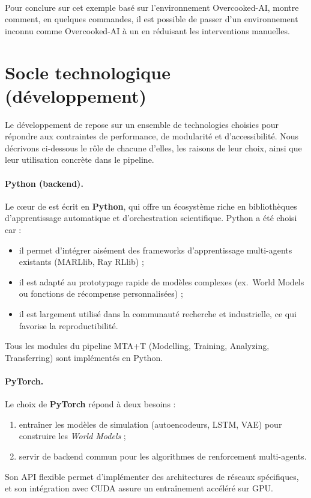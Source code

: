 \

Pour conclure sur cet exemple basé sur l'environnement Overcooked-AI,  montre comment, en quelques commandes, il est possible de passer d'un environnement inconnu comme Overcooked-AI à un  en réduisant les interventions manuelles.


\section{Socle technologique (développement)}\label{sec:cybmasde_tech_stack}

Le développement de  repose sur un ensemble de technologies choisies pour répondre aux contraintes de performance, de modularité et d'accessibilité.
Nous décrivons ci-dessous le rôle de chacune d'elles, les raisons de leur choix, ainsi que leur utilisation concrète dans le pipeline.

\paragraph{Python (backend).}
Le cœur de  est écrit en \textbf{Python}, qui offre un écosystème riche en bibliothèques d'apprentissage automatique et d'orchestration scientifique. Python a été choisi car :
\begin{itemize}
  \item il permet d'intégrer aisément des frameworks d'apprentissage multi-agents existants (MARLlib, Ray RLlib) ;
  \item il est adapté au prototypage rapide de modèles complexes (ex.~World Models ou fonctions de récompense personnalisées) ;
  \item il est largement utilisé dans la communauté recherche et industrielle, ce qui favorise la reproductibilité.
\end{itemize}
Tous les modules du pipeline MTA+T (Modelling, Training, Analyzing, Transferring) sont implémentés en Python.

\paragraph{PyTorch.}
Le choix de \textbf{PyTorch} répond à deux besoins :
\begin{enumerate}
  \item entraîner les modèles de simulation (autoencodeurs, LSTM, VAE) pour construire les \textit{World Models} ;
  \item servir de backend commun pour les algorithmes de renforcement multi-agents.
\end{enumerate}
Son API flexible permet d'implémenter des architectures de réseaux spécifiques, et son intégration avec CUDA assure un entraînement accéléré sur GPU.

